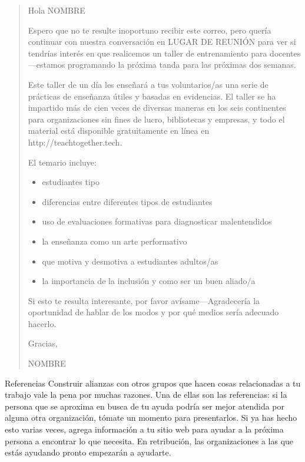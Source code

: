 \begin{quote}

  \noindent
  Hola NOMBRE
 
 Espero que no te resulte inoportuno recibir este correo,
 pero quería continuar con nuestra conversación en LUGAR DE REUNIÓN
 para ver si tendrías interés en que realicemos un taller de entrenamiento para docentes---estamos programando  la próxima tanda para las próximas dos semanas.

 Este taller de un día les enseñará a tus voluntarios/as
 una serie de prácticas de enseñanza útiles y basadas en evidencias.
El taller se ha impartido más de cien veces de diversas maneras en los seis continentes
 para organizaciones sin fines de lucro, bibliotecas y empresas,
 y todo el material está disponible gratuitamente en línea en http://teachtogether.tech.
 
El temario incluye:

  \begin{itemize}
  \item estudiantes tipo
  \item diferencias entre diferentes tipos de estudiantes 
  \item uso de evaluaciones formativas para diagnosticar malentendidos
  \item la enseñanza como un arte performativo
  \item que motiva y desmotiva a estudiantes adultos/as
  \item la importancia de la inclusión y como ser un buen aliado/a
  \end{itemize}

Si esto te resulta interesante,
por favor avísame---Agradecería la oportunidad de hablar de los modos 
y por qué medios sería adecuado hacerlo.

Gracias,

  NOMBRE

\end{quote}

\begin{aside}{Referencias}
Construir alianzas con otros grupos que hacen cosas relacionadas a tu trabajo
vale la pena por muchas razones.
Una de ellas son las referencias:
si la persona que se aproxima en busca de tu ayuda podría ser mejor atendida por alguna otra organización,
tómate un momento para presentarlos.
Si ya has hecho esto varias veces,
agrega información a tu sitio web para ayudar a la próxima persona a encontrar lo que necesita.
En retribución, las organizaciones a las que estás ayudando pronto empezarán a ayudarte.
\end{aside}

